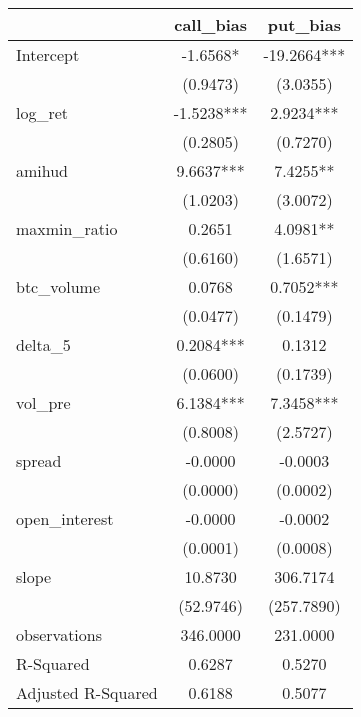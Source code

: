 \begin{tabular}{lcc}
\hline
                   & call\_bias &  put\_bias   \\
\midrule
\midrule
Intercept          & -1.6568*   & -19.2664***  \\
                   & (0.9473)   & (3.0355)     \\
log\_ret           & -1.5238*** & 2.9234***    \\
                   & (0.2805)   & (0.7270)     \\
amihud             & 9.6637***  & 7.4255**     \\
                   & (1.0203)   & (3.0072)     \\
maxmin\_ratio      & 0.2651     & 4.0981**     \\
                   & (0.6160)   & (1.6571)     \\
btc\_volume        & 0.0768     & 0.7052***    \\
                   & (0.0477)   & (0.1479)     \\
delta\_5           & 0.2084***  & 0.1312       \\
                   & (0.0600)   & (0.1739)     \\
vol\_pre           & 6.1384***  & 7.3458***    \\
                   & (0.8008)   & (2.5727)     \\
spread             & -0.0000    & -0.0003      \\
                   & (0.0000)   & (0.0002)     \\
open\_interest     & -0.0000    & -0.0002      \\
                   & (0.0001)   & (0.0008)     \\
slope              & 10.8730    & 306.7174     \\
                   & (52.9746)  & (257.7890)   \\
observations       & 346.0000   & 231.0000     \\
R-Squared          & 0.6287     & 0.5270       \\
Adjusted R-Squared & 0.6188     & 0.5077       \\
\hline
\end{tabular}